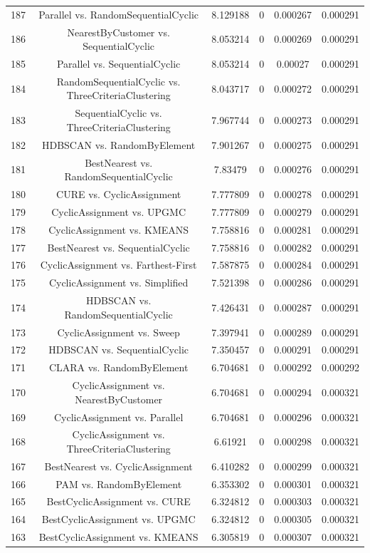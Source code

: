 \documentclass[a4paper,10pt]{article}
\begin{document}
\begin{landscape}
\begin{table}[!htp]
\begin{tabular}{cccccc}
187&Parallel vs. RandomSequentialCyclic&8.129188&0&0.000267&0.000291\\
186&NearestByCustomer vs. SequentialCyclic&8.053214&0&0.000269&0.000291\\
185&Parallel vs. SequentialCyclic&8.053214&0&0.00027&0.000291\\
184&RandomSequentialCyclic vs. ThreeCriteriaClustering&8.043717&0&0.000272&0.000291\\
183&SequentialCyclic vs. ThreeCriteriaClustering&7.967744&0&0.000273&0.000291\\
182&HDBSCAN vs. RandomByElement&7.901267&0&0.000275&0.000291\\
181&BestNearest vs. RandomSequentialCyclic&7.83479&0&0.000276&0.000291\\
180&CURE vs. CyclicAssignment&7.777809&0&0.000278&0.000291\\
179&CyclicAssignment vs. UPGMC&7.777809&0&0.000279&0.000291\\
178&CyclicAssignment vs. KMEANS&7.758816&0&0.000281&0.000291\\
177&BestNearest vs. SequentialCyclic&7.758816&0&0.000282&0.000291\\
176&CyclicAssignment vs. Farthest-First&7.587875&0&0.000284&0.000291\\
175&CyclicAssignment vs. Simplified&7.521398&0&0.000286&0.000291\\
174&HDBSCAN vs. RandomSequentialCyclic&7.426431&0&0.000287&0.000291\\
173&CyclicAssignment vs. Sweep&7.397941&0&0.000289&0.000291\\
172&HDBSCAN vs. SequentialCyclic&7.350457&0&0.000291&0.000291\\
171&CLARA vs. RandomByElement&6.704681&0&0.000292&0.000292\\
170&CyclicAssignment vs. NearestByCustomer&6.704681&0&0.000294&0.000321\\
169&CyclicAssignment vs. Parallel&6.704681&0&0.000296&0.000321\\
168&CyclicAssignment vs. ThreeCriteriaClustering&6.61921&0&0.000298&0.000321\\
167&BestNearest vs. CyclicAssignment&6.410282&0&0.000299&0.000321\\
166&PAM vs. RandomByElement&6.353302&0&0.000301&0.000321\\
165&BestCyclicAssignment vs. CURE&6.324812&0&0.000303&0.000321\\
164&BestCyclicAssignment vs. UPGMC&6.324812&0&0.000305&0.000321\\
163&BestCyclicAssignment vs. KMEANS&6.305819&0&0.000307&0.000321\\

\end{tabular}
\end{table}
\end{landscape}
\end{document}
